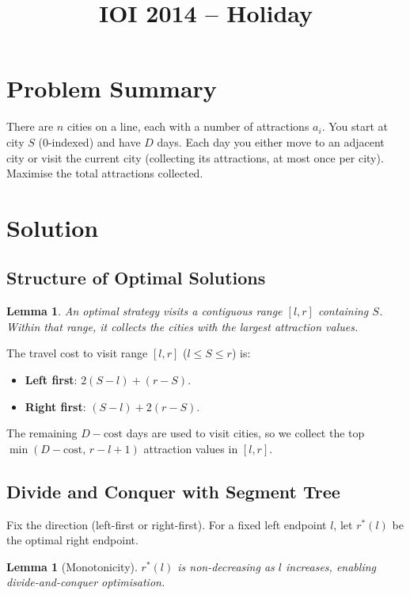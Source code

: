 \documentclass[11pt,a4paper]{article}
\title{IOI 2014 -- Holiday}
\author{}
\date{}
\newtheorem{lemma}[theorem]{Lemma}
\begin{document}
\maketitle

\section{Problem Summary}

There are $n$ cities on a line, each with a number of attractions $a_i$. You start at city $S$ (0-indexed) and have $D$ days. Each day you either move to an adjacent city or visit the current city (collecting its attractions, at most once per city). Maximise the total attractions collected.

\section{Solution}

\subsection{Structure of Optimal Solutions}

\begin{lemma}
An optimal strategy visits a contiguous range $[l, r]$ containing $S$. Within that range, it collects the cities with the largest attraction values.
\end{lemma}

The travel cost to visit range $[l, r]$ ($l \le S \le r$) is:
\begin{itemize}
  \item \textbf{Left first}: $2(S - l) + (r - S)$.
  \item \textbf{Right first}: $(S - l) + 2(r - S)$.
\end{itemize}
The remaining $D - \text{cost}$ days are used to visit cities, so we collect the top $\min(D - \text{cost},\, r - l + 1)$ attraction values in $[l, r]$.

\subsection{Divide and Conquer with Segment Tree}

Fix the direction (left-first or right-first). For a fixed left endpoint $l$, let $r^*(l)$ be the optimal right endpoint.

\begin{lemma}[Monotonicity]
$r^*(l)$ is non-decreasing as $l$ increases, enabling divide-and-conquer optimisation.
\end{lemma}
\end{document}
